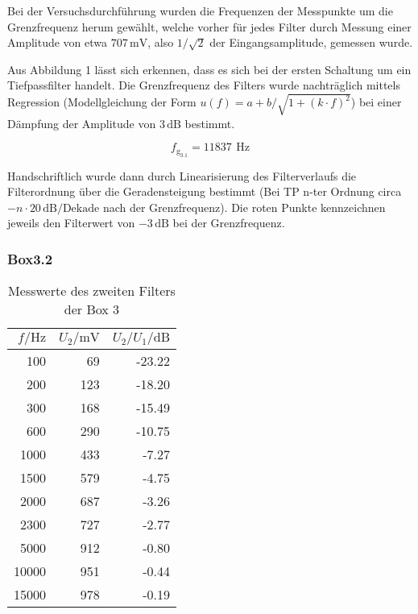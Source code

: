 \documentclass[a4paper, 12pt]{article}
\begin{document}
Bei der Versuchsdurchführung wurden die Frequenzen der Messpunkte um die
Grenzfrequenz herum gewählt, welche vorher für jedes Filter durch Messung einer
Amplitude von etwa $707 \, \si{\milli\volt}$, also $1/\sqrt{2}$ der
Eingangsamplitude, gemessen wurde.  

Aus Abbildung 1 lässt sich erkennen, dass es sich
bei der ersten Schaltung um ein Tiefpassfilter handelt. Die Grenzfrequenz des
Filters wurde nachträglich mittels Regression (Modellgleichung der Form $u(f) = a + b/\sqrt{1
  + (k \cdot f)^2}$) bei einer Dämpfung der Amplitude von $3 \, \si{\deci\bel}$ bestimmt.

$$f_{\textrm{g}_{3.1}} = 11837 \,\ \si{\hertz}$$

Handschriftlich wurde dann durch Linearisierung des Filterverlaufs die Filterordnung
über die Geradensteigung bestimmt (Bei TP n-ter Ordnung circa $-n\cdot 20 \,
\si{\deci\bel}/\textrm{Dekade}$ nach der Grenzfrequenz). Die roten Punkte
kennzeichnen jeweils den Filterwert von $-3 \, \si{\deci\bel}$ bei der Grenzfrequenz.
 


\subsubsection{Box3.2}

\begin{table}[H]
  \begin{center}
    \begin{tabular}{@{}rrr@{}}
      \toprule
      $f / \si{\hertz}$ & $U_2 / \si{\milli\volt}$ & $U_2/U_1 / \si{\deci\bel}$ \\ \midrule
      100   & 69  & -23.22 \\
      200   & 123 & -18.20 \\
      300   & 168 & -15.49 \\
      600   & 290 & -10.75 \\
      1000  & 433 & -7.27  \\
      1500  & 579 & -4.75  \\
      2000  & 687 & -3.26  \\
      2300  & 727 & -2.77  \\
      5000  & 912 & -0.80  \\
      10000 & 951 & -0.44  \\
      15000 & 978 & -0.19  \\ \bottomrule
    \end{tabular}
    \end{center}
    \caption{Messwerte des zweiten Filters der Box 3}
\end{table}
\end{document}
